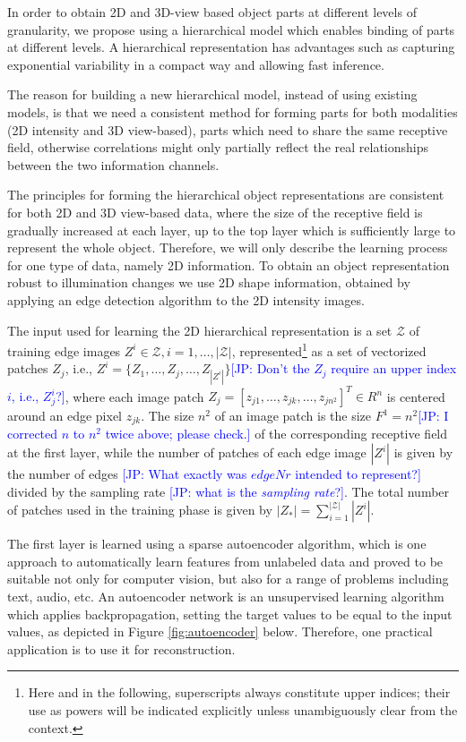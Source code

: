 \documentclass[runningheads]{llncs}
\newcommand{\commentJP}[1]{\textcolor{blue}{[JP: #1]}}
\begin{document}
In order to obtain 2D and 3D-view based object parts at different levels of granularity, we propose using a hierarchical model which enables binding of parts at different levels. A hierarchical representation has advantages such as capturing exponential variability in a compact way and allowing fast inference.

The reason for building a new hierarchical model, instead of using existing models, is that we need a consistent method for forming parts for both modalities (2D intensity and 3D view-based), parts which need to share the same receptive field, otherwise correlations might only partially reflect the real relationships between the two information channels.

The principles for forming the hierarchical object representations are consistent for both 2D and 3D view-based data, where the size of the receptive field is gradually increased at each layer, up to the top layer which is sufficiently large to represent the whole object. Therefore, we will only describe the learning process for one type of data, namely 2D information. To obtain an object representation robust to illumination changes we use 2D shape information, obtained by applying an edge detection algorithm to the 2D intensity images.

The input used for learning the 2D hierarchical representation is a set $\mathcal{Z}$ of training edge images $Z^i \in \mathcal{Z}, i=1,\ldots,|\mathcal{Z}|$, represented\footnote{Here and in the following, superscripts always constitute upper indices; their use as powers will be indicated explicitly unless unambiguously clear from the context.} as a set of vectorized patches $Z_j$, i.e.,
$Z^i=\{Z_1,\ldots,Z_j,\ldots,Z_{|Z^i|}\}$\commentJP{Don't the $Z_j$ require an upper index $i$, i.e., $Z_j^i$?}, where each image patch
$Z_j=[z_{j1},\ldots,z_{jk},\ldots,z_{jn^2}]^T \in R^n$ is centered around an edge pixel $z_{jk}$. The size $n^2$ of an image patch is the size $F^1=n^2$\commentJP{I corrected $n$ to $n^2$ twice above; please check.} of the corresponding receptive field at the first layer, while the number of patches of each edge image $|Z^i|$ is given by the number of edges \commentJP{What exactly was $edgeNr$ intended to represent?} divided by the sampling rate \commentJP{what is the \emph{sampling rate}?}. The total number of patches used in the training phase is given by $|Z_*|=\sum_{i=1}^{|\mathcal{Z}|} |Z^i|$.

The first layer is learned using a sparse autoencoder algorithm, which is one approach to automatically learn features from unlabeled data and proved to be suitable not only for computer vision, but also for a range of problems including text, audio, etc. An autoencoder network is an unsupervised learning algorithm which applies backpropagation, setting the target values to be equal to the input values, as depicted in Figure \ref{fig:autoencoder} below. Therefore, one practical application is to use it for reconstruction. 
\end{document}
